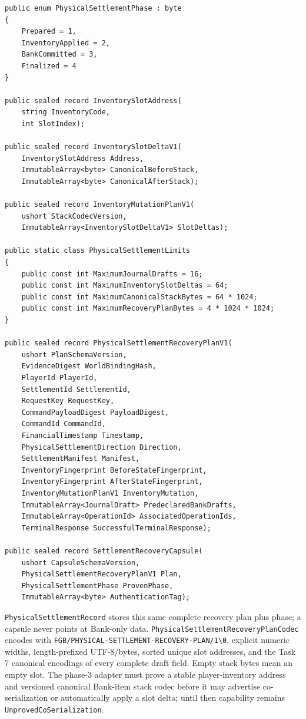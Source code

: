 \documentclass[
  10pt,
  letterpaper,
]{article}
\newcommand{\passthrough}[1]{#1}
\begin{document}
\begin{lstlisting}
public enum PhysicalSettlementPhase : byte
{
    Prepared = 1,
    InventoryApplied = 2,
    BankCommitted = 3,
    Finalized = 4
}

public sealed record InventorySlotAddress(
    string InventoryCode,
    int SlotIndex);

public sealed record InventorySlotDeltaV1(
    InventorySlotAddress Address,
    ImmutableArray<byte> CanonicalBeforeStack,
    ImmutableArray<byte> CanonicalAfterStack);

public sealed record InventoryMutationPlanV1(
    ushort StackCodecVersion,
    ImmutableArray<InventorySlotDeltaV1> SlotDeltas);

public static class PhysicalSettlementLimits
{
    public const int MaximumJournalDrafts = 16;
    public const int MaximumInventorySlotDeltas = 64;
    public const int MaximumCanonicalStackBytes = 64 * 1024;
    public const int MaximumRecoveryPlanBytes = 4 * 1024 * 1024;
}

public sealed record PhysicalSettlementRecoveryPlanV1(
    ushort PlanSchemaVersion,
    EvidenceDigest WorldBindingHash,
    PlayerId PlayerId,
    SettlementId SettlementId,
    RequestKey RequestKey,
    CommandPayloadDigest PayloadDigest,
    CommandId CommandId,
    FinancialTimestamp Timestamp,
    PhysicalSettlementDirection Direction,
    SettlementManifest Manifest,
    InventoryFingerprint BeforeStateFingerprint,
    InventoryFingerprint AfterStateFingerprint,
    InventoryMutationPlanV1 InventoryMutation,
    ImmutableArray<JournalDraft> PredeclaredBankDrafts,
    ImmutableArray<OperationId> AssociatedOperationIds,
    TerminalResponse SuccessfulTerminalResponse);

public sealed record SettlementRecoveryCapsule(
    ushort CapsuleSchemaVersion,
    PhysicalSettlementRecoveryPlanV1 Plan,
    PhysicalSettlementPhase ProvenPhase,
    ImmutableArray<byte> AuthenticationTag);
\end{lstlisting}

\texttt{PhysicalSettlementRecord} stores this same complete recovery
plan plus phase; a capsule never points at Bank-only data.
\texttt{PhysicalSettlementRecoveryPlanCodec} encodes with
\texttt{FGB/}\allowbreak{}\texttt{PHYSICAL-}\allowbreak{}\texttt{SETTLEMENT-}\allowbreak{}\texttt{RECOVERY-}\allowbreak{}\texttt{PLAN/}\allowbreak{}\texttt{1\textbackslash{}}\allowbreak{}\texttt{0},
explicit numeric widths, length-prefixed UTF-8/bytes, sorted unique slot
addresses, and the Task 7 canonical encodings of every complete draft
field. Empty stack bytes mean an empty slot. The phase-3 adapter must
prove a stable player-inventory address and versioned canonical
Bank-item stack codec before it may advertise co-serialization or
automatically apply a slot delta; until then capability remains
\passthrough{\lstinline!UnprovedCoSerialization!}.
\end{document}
